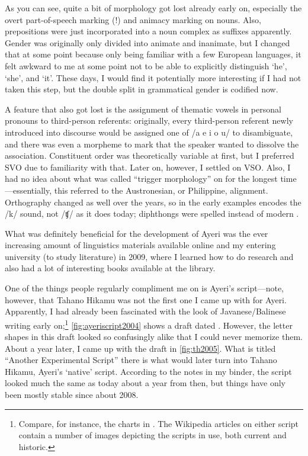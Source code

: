 As you can see, quite a bit of morphology got lost already early on, especially
the overt part-of-speech marking (!) and animacy marking on nouns. Also,
prepositions were just incorporated into a noun complex as suffixes apparently.
Gender was originally only divided into animate and inanimate, but I changed
that at some point because only being familiar with a few European languages,
it felt awkward to me at some point not to be able to explicitly distinguish
`he', `she', and `it'. These days, I would find it potentially more interesting
if I had not taken this step, but the double split in grammatical gender is
codified now.

A feature that also got lost is the assignment of thematic vowels in personal
pronouns to third-person referents: originally, every third-person referent
newly introduced into discourse would be assigned one of /a e i o u/ to
disambiguate, and there was even a morpheme to mark that the speaker wanted to
dissolve the association. Constituent order was theoretically variable at
first, but I preferred SVO due to familiarity with that. Later on, however, I
settled on VSO. Also, I had no idea about what was called ``trigger
morphology'' on  for the longest time---essentially, this
referred to the Austronesian, or Philippine, alignment. Orthography changed as
well over the years, so  in the early examples encodes the /k/ sound,
not /ʧ/ as it does today; diphthongs were spelled  instead of modern
.

What was definitely beneficial for the development of Ayeri was the ever 
increasing amount of linguistics materials available online and my entering 
university (to study literature) in 2009, where I learned how to do research 
and also had a lot of interesting books available at the library.

One of the things people regularly compliment me on is Ayeri's script---note,
however, that Tahano Hikamu was not the first one I came
up with for Ayeri. Apparently, I had already been fascinated with the look of
Javanese/Balinese writing early on;\footnote{Compare, for instance, the charts
in \citet{kuipersmcdermott1996}. The Wikipedia articles on either script
contain a number of images depicting the scripts in use, both current and
historic.} \autoref{fig:ayeriscript2004} shows a draft dated
. However, the letter shapes in this draft looked so
confusingly alike that I could never memorize them. About a year later, I came
up with the draft in \autoref{fig:th2005}. What is titled ``Another
Experimental Script'' there is what would later turn into Tahano Hikamu,
Ayeri's `native' script. According to the notes in my binder, the script
looked much the same as today about a year from then, but things have only been
mostly stable since about 2008.

